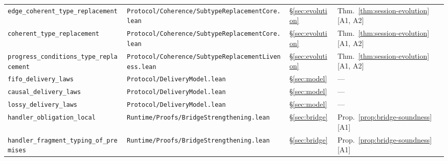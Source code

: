 \documentclass[a4paper,10pt,twocolumn,english]{article}
\numberwithin{equation}{section}
\theoremstyle{paperdef}
\theoremstyle{paperplain}
\theoremstyle{paperdef}
\theoremstyle{paperremark}
\begin{document}
\begin{table}[H]
\begin{tabularx}{\textwidth}{L{0.27\textwidth}L{0.37\textwidth}L{0.06\textwidth}>{\raggedright\arraybackslash}X}
		\texttt{edge\_coherent\_type\_\allowbreak replacement}                    & \texttt{Protocol/\allowbreak Coherence/\allowbreak}\mbox{\texttt{SubtypeReplacementCore.lean}}                                    & \S\ref{sec:evolution}    & Thm.~\ref{thm:session-evolution} [A1, A2]  \\
		\texttt{coherent\_type\_\allowbreak replacement}                          & \texttt{Protocol/\allowbreak Coherence/\allowbreak}\mbox{\texttt{SubtypeReplacementCore.lean}}                                    & \S\ref{sec:evolution}    & Thm.~\ref{thm:session-evolution} [A1, A2]  \\
		\texttt{progress\_conditions\_\allowbreak type\_replacement}              & \texttt{Protocol/\allowbreak Coherence/\allowbreak}\mbox{\texttt{SubtypeReplacementLiveness.lean}}                                & \S\ref{sec:evolution}    & Thm.~\ref{thm:session-evolution} [A1, A2]  \\
		\texttt{fifo\_delivery\_laws}                                             & \texttt{Protocol/\allowbreak}\mbox{\texttt{DeliveryModel.lean}}                                                                   & \S\ref{sec:model}        & ---                                        \\
		\texttt{causal\_delivery\_laws}                                           & \texttt{Protocol/\allowbreak}\mbox{\texttt{DeliveryModel.lean}}                                                                   & \S\ref{sec:model}        & ---                                        \\
		\texttt{lossy\_delivery\_laws}                                            & \texttt{Protocol/\allowbreak}\mbox{\texttt{DeliveryModel.lean}}                                                                   & \S\ref{sec:model}        & ---                                        \\
		\texttt{handler\_obligation\_\allowbreak local}                           & \texttt{Runtime/\allowbreak Proofs/\allowbreak}\mbox{\texttt{BridgeStrengthening.lean}}                            & \S\ref{sec:bridge}       & Prop.~\ref{prop:bridge-soundness} [A1]     \\
		\texttt{handler\_fragment\_typing\_\allowbreak of\_premises}              & \texttt{Runtime/\allowbreak Proofs/\allowbreak}\mbox{\texttt{BridgeStrengthening.lean}}                            & \S\ref{sec:bridge}       & Prop.~\ref{prop:bridge-soundness} [A1]     \\

\end{tabularx}
\end{table}
\end{document}
